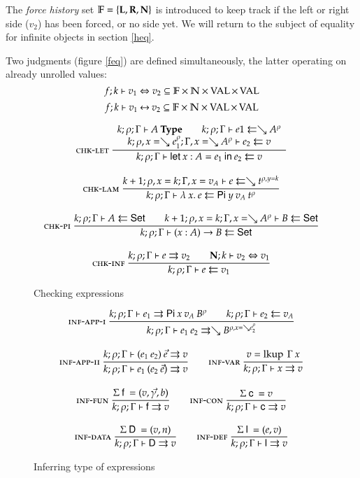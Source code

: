 The \emph{force history} set $ \mathbb{F} = \{\mathbf{L}, \mathbf{R}, \mathbf{N} \} $ is introduced to keep track if the left or right side ($v_2$) has been forced, or no side yet.
We will return to the subject of equality for infinite objects in section \ref{heq}.

Two judgments (figure \ref{feq}) are defined simultaneously, the latter operating on already unrolled values:
\[f;k\vdash v_1\Leftrightarrow v_2 \subseteq \mathbb{F} \times \mathbb{N} \times \operatorname{VAL} \times \operatorname{VAL} \]
\[f;k\vdash v_1{\:\leftrightarrow\:}v_2 \subseteq \mathbb{F} \times \mathbb{N} \times\operatorname{VAL} \times \operatorname{VAL} \]

\begin{figure}[htp]

\begin{gather*}
\mbox{\sc chk-let}\ \dfrac{\begin{array}[b]{c}
k;\rho;\Gamma\vdash A\:\mathbf{Type}
\qquad
k;\rho;\Gamma\vdash e1\leftleftarrows\searrow A^{\rho}
\\
k;\rho,x=\searrow e_1^{\rho};\Gamma,x=\searrow A^{\rho}\vdash e_2\leftleftarrows v
\end{array}}{k;\rho;\Gamma\vdash\mathsf{let}\: x : A = e_1 \: \mathsf{in}\:{e_2}\leftleftarrows v}
\\[2ex]
\mbox{\sc chk-lam}\ \dfrac{k+1;\rho,x=k;\Gamma,x=v_A\vdash e\leftleftarrows\searrow t^{\rho,y=k}}{k;\rho;\Gamma\vdash\lambda\: x .\:{e}\leftleftarrows\mathsf{Pi} \: y \: v_A \: t^{\rho}}
\\[2ex]
\mbox{\sc chk-pi}\ \dfrac{k;\rho;\Gamma\vdash A\leftleftarrows\mathsf{Set}
\qquad
k+1;\rho,x=k;\Gamma,x=\searrow A^{\rho}\vdash B\leftleftarrows\mathsf{Set}
}{k;\rho;\Gamma\vdash( x : A ) \rightarrow{B}\leftleftarrows\mathsf{Set}}
\\[2ex]
\mbox{\sc chk-inf}\ \dfrac{k;\rho;\Gamma\vdash e\rightrightarrows v_2
\qquad
{\mathbf{N};k\vdash v_2\Leftrightarrow v_1}}{k;\rho;\Gamma\vdash e\leftleftarrows v_1}
\end{gather*}
\caption{Checking expressions}
\label{fcheck}
\end{figure}

\begin{figure}[htp]
\begin{gather*}
\mbox{\sc inf-app-i}\ \dfrac{k;\rho;\Gamma\vdash e_1\rightrightarrows\mathsf{Pi} \: x \: v_A \: B^{\rho}
\qquad k;\rho;\Gamma\vdash e_2\leftleftarrows v_A}{k;\rho;\Gamma\vdash e_1 \: e_2\rightrightarrows\searrow B^{\rho,x=\searrow e_2^{\rho}}}
\\[2ex]
\mbox{\sc inf-app-ii}\ \dfrac{k;\rho;\Gamma\vdash(e_1 \: e_2)\:\vec{e}\rightrightarrows v}{k;\rho;\Gamma\vdash e_1 \: (e_2 \: \vec{e})\rightrightarrows v}
\qquad
\mbox{\sc inf-var}\ \dfrac{v = \operatorname{lkup} \: \Gamma \: x }{k;\rho;\Gamma\vdash x\rightrightarrows v}
\\[2ex]
\mbox{\sc inf-fun}\ \dfrac{\Sigma \: \mathsf{f} \: = (v,\vec{\gamma},b) }{k;\rho;\Gamma\vdash\mathsf{f}\rightrightarrows v}
\qquad
\mbox{\sc inf-con}\ \dfrac{\Sigma \: \mathsf{c} \: = v}{k;\rho;\Gamma\vdash\mathsf{c}\rightrightarrows v}
\\[2ex] 
\mbox{\sc inf-data}\ \dfrac{\Sigma \: \mathsf{D} \: = (v,n)}{k;\rho;\Gamma\vdash\mathsf{D}\rightrightarrows v} 
\qquad
\mbox{\sc inf-def}\ \dfrac{\Sigma \: \mathsf{l} \: = (e,v)}{k;\rho;\Gamma\vdash\mathsf{l}\rightrightarrows v}
\end{gather*}
\caption{Inferring type of expressions}
\label{finf}
\end{figure}

